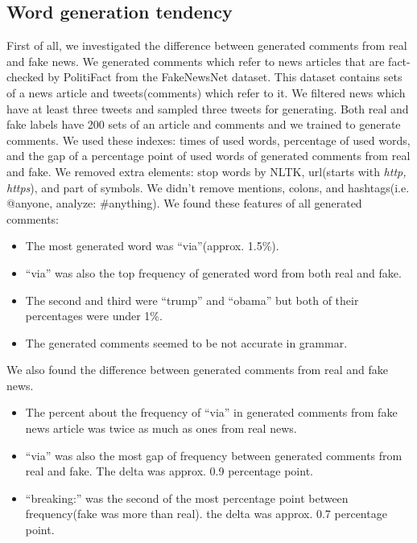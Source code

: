 \documentclass[conference]{IEEEtran}
\begin{document}
\subsection{Word generation tendency}
\label{subsec:trend}
First of all, we investigated the difference between generated comments from real and fake news.
We generated comments which refer to news articles that are fact-checked by PolitiFact from the FakeNewsNet dataset\cite{Shu2018FakeNewsNetAD}.
This dataset contains sets of a news article and tweets(comments) which refer to it.
We filtered news which have at least three tweets and sampled three tweets for generating.
Both real and fake labels have 200 sets of an article and comments and we trained to generate comments. 
We used these indexes: times of used words, percentage of used words, and the gap of a percentage point of used words of generated comments from real and fake.
We removed extra elements: stop words by NLTK, url(starts with \textit{http, https}), and part of symbols.
We didn't remove mentions, colons, and hashtags(i.e. @anyone, analyze: \#anything).
We found these features of all generated comments:
\begin{itemize}[]
    \item The most generated word was ``via''(approx. 1.5\%).  
    \item ``via'' was also the top frequency of generated word from both real and fake. 
    \item The second and third were ``trump'' and ``obama'' but both of their percentages were under 1\%.
    \item The generated comments seemed to be not accurate in grammar.
\end{itemize}
We also found the difference between generated comments from real and fake news.
\begin{itemize}[]
    \item The percent about the frequency of ``via'' in generated comments from fake news article was twice as much as ones from real news.
    \item ``via'' was also the most gap of frequency between generated comments from real and fake.  The delta was approx. 0.9 percentage point.
    \item ``breaking:'' was the second of the most percentage point between frequency(fake was more than real). the delta was approx. 0.7 percentage point.
\end{itemize}
\end{document}
